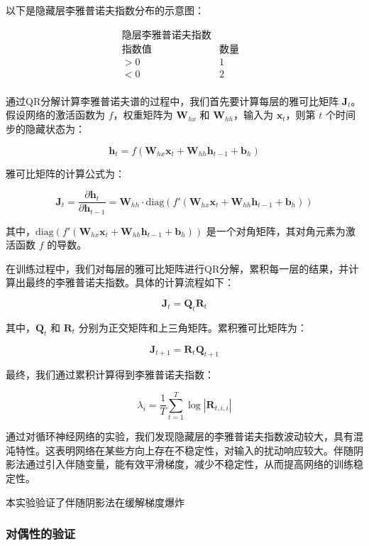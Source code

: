 \documentclass[12pt,a4paper]{amsart}
\begin{document}
以下是隐藏层李雅普诺夫指数分布的示意图：

\[
\begin{array}{ccc}
\text{隐层李雅普诺夫指数} & & \\
\hline
\text{指数值} & \text{数量} \\
\hline
>0 & 1 \\
<0 & 2 \\
\end{array}
\]

通过QR分解计算李雅普诺夫谱的过程中，我们首先要计算每层的雅可比矩阵 \(\mathbf{J}_t\)。假设网络的激活函数为 \( f \)，权重矩阵为 \(\mathbf{W}_{hx}\) 和 \(\mathbf{W}_{hh}\)，输入为 \(\mathbf{x}_t\)，则第 \(t\) 个时间步的隐藏状态为：

\[
\mathbf{h}_t = f(\mathbf{W}_{hx} \mathbf{x}_t + \mathbf{W}_{hh} \mathbf{h}_{t-1} + \mathbf{b}_h)
\]

雅可比矩阵的计算公式为：

\[
\mathbf{J}_t = \frac{\partial \mathbf{h}_t}{\partial \mathbf{h}_{t-1}} = \mathbf{W}_{hh} \cdot \text{diag}(f'(\mathbf{W}_{hx} \mathbf{x}_t + \mathbf{W}_{hh} \mathbf{h}_{t-1} + \mathbf{b}_h))
\]

其中，\(\text{diag}(f'(\mathbf{W}_{hx} \mathbf{x}_t + \mathbf{W}_{hh} \mathbf{h}_{t-1} + \mathbf{b}_h))\) 是一个对角矩阵，其对角元素为激活函数 \(f\) 的导数。

在训练过程中，我们对每层的雅可比矩阵进行QR分解，累积每一层的结果，并计算出最终的李雅普诺夫指数。具体的计算流程如下：

\[
\mathbf{J}_t = \mathbf{Q}_t \mathbf{R}_t
\]

其中，\(\mathbf{Q}_t\) 和 \(\mathbf{R}_t\) 分别为正交矩阵和上三角矩阵。累积雅可比矩阵为：

\[
\mathbf{J}_{t+1} = \mathbf{R}_t \mathbf{Q}_{t+1}
\]

最终，我们通过累积计算得到李雅普诺夫指数：

\[
\lambda_i = \frac{1}{T} \sum_{t=1}^T \log |\mathbf{R}_{t,i,i}|
\]

通过对循环神经网络的实验，我们发现隐藏层的李雅普诺夫指数波动较大，具有混沌特性。这表明网络在某些方向上存在不稳定性，对输入的扰动响应较大。伴随阴影法通过引入伴随变量，能有效平滑梯度，减少不稳定性，从而提高网络的训练稳定性。

本实验验证了伴随阴影法在缓解梯度爆炸

\subsubsection{对偶性的验证}
\end{document}
